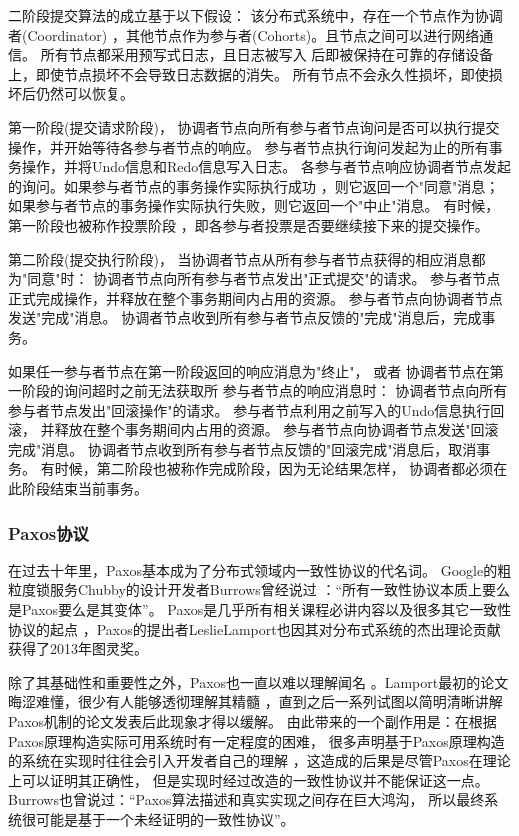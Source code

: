 二阶段提交算法的成立基于以下假设：
该分布式系统中，存在一个节点作为协调者(Coordinator)
，其他节点作为参与者(Cohorts)。且节点之间可以进行网络通信。
所有节点都采用预写式日志，且日志被写入
后即被保持在可靠的存储设备上，即使节点损坏不会导致日志数据的消失。
所有节点不会永久性损坏，即使损坏后仍然可以恢复。

第一阶段(提交请求阶段)，
协调者节点向所有参与者节点询问是否可以执行提交操作，并开始等待各参与者节点的响应。
参与者节点执行询问发起为止的所有事务操作，并将Undo信息和Redo信息写入日志。
各参与者节点响应协调者节点发起的询问。如果参与者节点的事务操作实际执行成功
，则它返回一个"同意"消息；如果参与者节点的事务操作实际执行失败，则它返回一个"中止"消息。
有时候，第一阶段也被称作投票阶段
，即各参与者投票是否要继续接下来的提交操作。

第二阶段(提交执行阶段)，
当协调者节点从所有参与者节点获得的相应消息都为"同意"时：
协调者节点向所有参与者节点发出"正式提交"的请求。
参与者节点正式完成操作，并释放在整个事务期间内占用的资源。
参与者节点向协调者节点发送"完成"消息。
协调者节点收到所有参与者节点反馈的"完成"消息后，完成事务。

如果任一参与者节点在第一阶段返回的响应消息为"终止"，
或者 协调者节点在第一阶段的询问超时之前无法获取所
参与者节点的响应消息时：
协调者节点向所有参与者节点发出"回滚操作"的请求。
参与者节点利用之前写入的Undo信息执行回滚，
并释放在整个事务期间内占用的资源。
参与者节点向协调者节点发送"回滚完成"消息。
协调者节点收到所有参与者节点反馈的"回滚完成"消息后，取消事务。
有时候，第二阶段也被称作完成阶段，因为无论结果怎样，
协调者都必须在此阶段结束当前事务。
\subsubsection{Paxos协议}
在过去十年里，Paxos基本成为了分布式领域内一致性协议的代名词。
Google的粗粒度锁服务Chubby的设计开发者Burrows曾经说过
：“所有一致性协议本质上要么是Paxos要么是其变体”。
Paxos是几乎所有相关课程必讲内容以及很多其它一致性协议的起点
，Paxos的提出者LeslieLamport也因其对分布式系统的杰出理论贡献获得了2013年图灵奖。

除了其基础性和重要性之外，Paxos也一直以难以理解闻名
。Lamport最初的论文晦涩难懂，很少有人能够透彻理解其精髓
，直到之后一系列试图以简明清晰讲解Paxos机制的论文发表后此现象才得以缓解。
由此带来的一个副作用是：在根据Paxos原理构造实际可用系统时有一定程度的困难，
很多声明基于Paxos原理构造的系统在实现时往往会引入开发者自己的理解
，这造成的后果是尽管Paxos在理论上可以证明其正确性，
但是实现时经过改造的一致性协议并不能保证这一点。
Burrows也曾说过：“Paxos算法描述和真实实现之间存在巨大鸿沟，
所以最终系统很可能是基于一个未经证明的一致性协议”。

